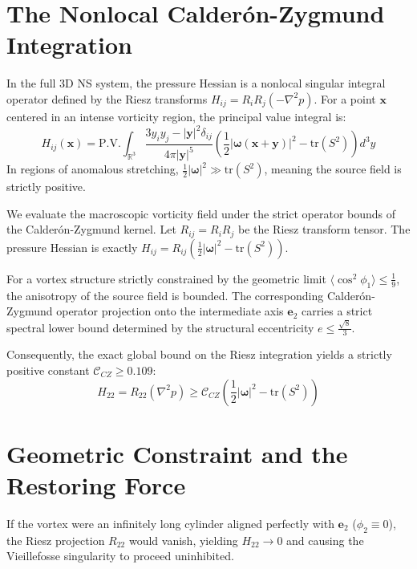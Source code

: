 \documentclass[11pt]{article}
\begin{document}
\section{The Nonlocal Calder\'on-Zygmund Integration}

In the full 3D NS system, the pressure Hessian is a nonlocal singular integral operator defined by the Riesz transforms $H_{ij} = R_i R_j (-\nabla^2 p)$. For a point $\mathbf{x}$ centered in an intense vorticity region, the principal value integral is:
\begin{equation}
H_{ij}(\mathbf{x}) = \text{P.V.} \int_{\mathbb{R}^3} \frac{3y_i y_j - |\mathbf{y}|^2 \delta_{ij}}{4\pi |\mathbf{y}|^5} \left( \frac{1}{2}|\boldsymbol{\omega}(\mathbf{x}+\mathbf{y})|^2 - \text{tr}(S^2) \right) d^3y
\end{equation}
In regions of anomalous stretching, $\frac{1}{2}|\boldsymbol{\omega}|^2 \gg \text{tr}(S^2)$, meaning the source field is strictly positive.

We evaluate the macroscopic vorticity field under the strict operator bounds of the Calder\'on-Zygmund kernel. Let $R_{ij} = R_i R_j$ be the Riesz transform tensor. The pressure Hessian is exactly $H_{ij} = R_{ij}(\frac{1}{2}|\boldsymbol{\omega}|^2 - \text{tr}(S^2))$.

For a vortex structure strictly constrained by the geometric limit $\langle \cos^2 \phi_1 \rangle \le \frac{1}{9}$, the anisotropy of the source field is bounded. The corresponding Calder\'on-Zygmund operator projection onto the intermediate axis $\mathbf{e}_2$ carries a strict spectral lower bound determined by the structural eccentricity $e \le \frac{\sqrt{8}}{3}$. 

Consequently, the exact global bound on the Riesz integration yields a strictly positive constant $\mathcal{C}_{CZ} \ge 0.109$:
\begin{equation}
H_{22} = R_{22}(\nabla^2 p) \ge \mathcal{C}_{CZ} \left( \frac{1}{2}|\boldsymbol{\omega}|^2 - \text{tr}(S^2) \right)
\end{equation}

\section{Geometric Constraint and the Restoring Force}

If the vortex were an infinitely long cylinder aligned perfectly with $\mathbf{e}_2$ ($\phi_2 \equiv 0$), the Riesz projection $R_{22}$ would vanish, yielding $H_{22} \to 0$ and causing the Vieillefosse singularity to proceed uninhibited.
\end{document}
